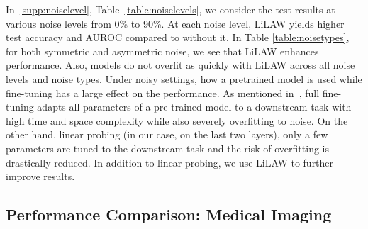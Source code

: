 \documentclass{article}
\theoremstyle{plain}
\theoremstyle{definition}
\theoremstyle{remark}
\begin{document}
\begin{table}[h!] \centering {} \caption{CIFAR-100-M on different noise types at 50\% noise level. \label{table:noisetypes}} \end{table}
\vspace{-1em}
In~\ref{supp:noiselevel}, Table~\ref{table:noiselevels}, we consider the test results at various noise levels from 0\% to 90\%. At each noise level, LiLAW yields higher test accuracy and AUROC compared to without it. %
In Table \ref{table:noisetypes}, for both symmetric and asymmetric noise, we see that LiLAW enhances performance. Also, models do not overfit as quickly with LiLAW across all noise levels and noise types. Under noisy settings, how a pretrained model is used while fine-tuning has a large effect on the performance. As mentioned in~\citet{marrium2024implicit}, full fine-tuning adapts all parameters of a pre-trained model to a downstream task with high time and space complexity while also severely overfitting to noise. On the other hand, linear probing (in our case, on the last two layers), only a few parameters are tuned to the downstream task and the risk of overfitting is drastically reduced. In addition to linear probing, we use LiLAW to further improve results.

\subsection{Performance Comparison: Medical Imaging}
\end{document}
